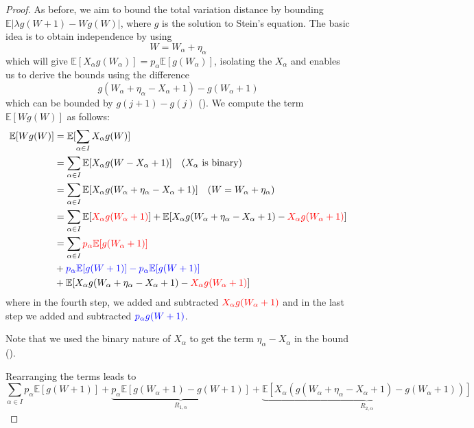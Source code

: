 \documentclass{article}
\begin{document}
\begin{proof}

    As before, we aim to bound the total variation distance by bounding $\mathbb{E}|\lambda g(W+1) - Wg(W)|$, where $g$ is the solution to Stein's equation.  The basic idea is to obtain independence by using 
    \[
       W = W_\alpha + \eta_\alpha  
    \]
    which will give $\mathbb{E}[X_\alpha g(W_\alpha )] = p_\alpha \mathbb{E}[g(W_\alpha)]$, isolating the $X_\alpha$ and enables us to derive the bounds using the difference 
    \[
       g(W_\alpha + \eta_\alpha -X_\alpha +  1) - g(W_\alpha + 1)  
    \]
    which can be bounded by $g(j+1)-g(j)$ (). We compute the term $\mathbb{E}[Wg(W)]$ as follows:  
    \begin{align*}
        \mathbb{E}[Wg(W)] &= \mathbb{E}[\sum_{\alpha \in I} X_\alpha g(W)]\\
        &= \sum_{\alpha \in I} \mathbb{E}[X_\alpha g(W - X_\alpha + 1)] \quad \text{($X_\alpha$ is binary)}
        \\
        &= \sum_{\alpha \in I} \mathbb{E}[X_\alpha g(W_\alpha + \eta_\alpha -X_\alpha +  1)]\quad \text{($W = W_\alpha + \eta_\alpha$)}
        \\
        &= \sum_{\alpha \in I} \mathbb{E}[\textcolor{red}{X_\alpha g(W_\alpha + 1)}] + \mathbb{E}[X_\alpha g(W_\alpha + \eta_\alpha -X_\alpha +  1) - \textcolor{red}{X_\alpha g(W_\alpha + 1)}]\\
        &= \sum_{\alpha \in I} \textcolor{red}{p_\alpha \mathbb{E}[g(W_\alpha + 1)]} \\
        &+ \color{blue}{p_\alpha \mathbb{E}[g(W+1)] - p_\alpha \mathbb{E}[g(W+1)]} \\
        &+ \mathbb{E}[X_\alpha g(W_\alpha + \eta_\alpha -X_\alpha +  1) - \textcolor{red}{X_\alpha g(W_\alpha + 1)}]
    \end{align*}
where in the fourth step, we added and subtracted $\textcolor{red}{X_\alpha g(W_\alpha + 1)}$ and in the last step we added and subtracted $\textcolor{blue}{p_\alpha g(W+1)}$.  

\begin{remark}
    Note that we used the binary nature of $X_\alpha$ to get the term $\eta_\alpha- X_\alpha$ in the bound ().
\end{remark}

Rearranging the terms leads to 
    \[\sum_{\alpha \in I} p_\alpha \mathbb{E}[g(W + 1)] + \underbrace{p_\alpha \mathbb{E}[g(W_\alpha+1) - g(W+1)]}_{R_{1,\alpha}} + \underbrace{\mathbb{E}[X_\alpha (g(W_\alpha + \eta_\alpha -X_\alpha +  1) - g(W_\alpha + 1))]}_{R_{2, \alpha}}\] 


\end{proof}
\end{document}
